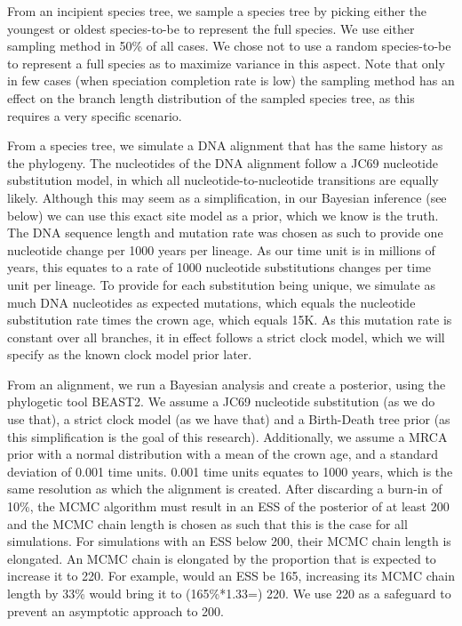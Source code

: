 \documentclass{article}
\begin{document}
From an incipient species tree, we sample a species tree
by picking either the youngest or oldest
species-to-be to represent the full species.
We use either sampling method in 50\% of all cases. We chose not to use
a random species-to-be to represent a full species as to maximize variance
in this aspect. Note that only in few cases (when speciation completion rate
is low) the sampling method has an effect on the branch length distribution
of the sampled species tree, as this requires a very specific scenario.

From a species tree, we simulate a DNA alignment that has the same history
as the phylogeny. The nucleotides of the DNA alignment follow a JC69
nucleotide substitution model, in which all nucleotide-to-nucleotide transitions
are equally likely. Although this may seem as a simplification, in our Bayesian
inference (see below) we can use this exact site model as a prior, which we 
know is the truth.
The DNA sequence length and mutation rate was chosen as such to provide one
nucleotide change per 1000 years per lineage. As our time unit is in 
millions of years, this equates to a rate of 1000 nucleotide substitutions 
changes per time unit per lineage. To provide for each substitution being unique,
we simulate as much DNA nucleotides as expected mutations, which equals the
nucleotide substitution rate times the crown age, which equals 15K. As this
mutation rate is constant over all branches, it in effect follows a strict 
clock model, which we will specify as the known clock model prior later.

From an alignment, we run a Bayesian analysis and create a posterior, 
using the phylogetic tool BEAST2. We assume a
JC69 nucleotide substitution (as we do use that), a strict clock model (as
we have that) and a Birth-Death tree prior (as this simplification is the goal
of this research). Additionally, we assume a MRCA prior with a normal distribution
with a mean of the crown age, and a standard deviation of 0.001 time units. 0.001
time units equates to 1000 years, which is the same resolution as which the
alignment is created. After discarding a burn-in of 10\%, the MCMC algorithm must 
result in an ESS of the posterior of at least 200 and the MCMC chain length is 
chosen as such that this is the case for all simulations. For simulations
with an ESS below 200, their MCMC chain length is elongated. An
MCMC chain is elongated by the proportion that is expected to increase it to 220. 
For example, would an ESS be 165, increasing its MCMC chain length by 33\% 
would bring it to (165\%*1.33=) 220. We use 220 as a safeguard to prevent 
an asymptotic approach to 200. 
\end{document}

